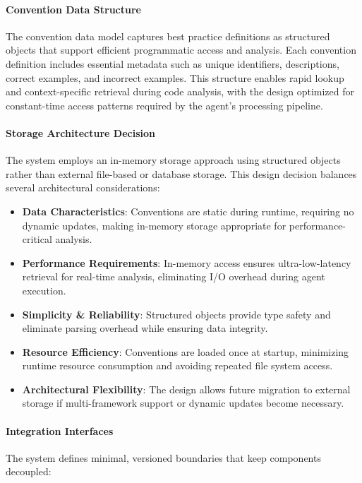 \begin{spacing}{1.2}
\paragraph{Convention Data Structure}
The convention data model captures best practice definitions as structured objects that support efficient programmatic access and analysis. Each convention definition includes essential metadata such as unique identifiers, descriptions, correct examples, and incorrect examples. This structure enables rapid lookup and context-specific retrieval during code analysis, with the design optimized for constant-time access patterns required by the agent's processing pipeline.

\paragraph{Storage Architecture Decision}
The system employs an in-memory storage approach using structured objects rather than external file-based or database storage. This design decision balances several architectural considerations:

\begin{itemize}
    \item \textbf{Data Characteristics}: Conventions are static during runtime, requiring no dynamic updates, making in-memory storage appropriate for performance-critical analysis.
    \item \textbf{Performance Requirements}: In-memory access ensures ultra-low-latency retrieval for real-time analysis, eliminating I/O overhead during agent execution.
    \item \textbf{Simplicity \& Reliability}: Structured objects provide type safety and eliminate parsing overhead while ensuring data integrity.
    \item \textbf{Resource Efficiency}: Conventions are loaded once at startup, minimizing runtime resource consumption and avoiding repeated file system access.
    \item \textbf{Architectural Flexibility}: The design allows future migration to external storage if multi-framework support or dynamic updates become necessary.
\end{itemize} 

\paragraph{Integration Interfaces}
The system defines minimal, versioned boundaries that keep components decoupled:


\end{spacing}
